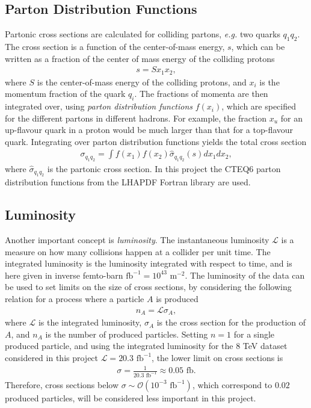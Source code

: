 \documentclass[twoside,english]{uiofysmaster}
\begin{document}
{\subsection{Parton Distribution Functions}

Partonic cross sections are calculated for colliding partons, \textit{e.g.} two quarks $q_1 q_2$. The cross section is a function of the center-of-mass energy, $s$, which can be written as a fraction of the center of mass energy of the colliding protons
\begin{align}
s = S x_1 x_2,
\end{align}
where $S$ is the center-of-mass energy of the colliding protons, and $x_i$ is the momentum fraction of the quark $q_i$. The fractions of momenta are then integrated over, using \textit{parton distribution functions} $f(x_i)$, which are specified for the different partons in different hadrons. For example, the fraction $x_u$ for an up-flavour quark in a proton would be much larger than that for a top-flavour quark. Integrating over parton distribution functions yields the total cross section
\begin{align}
\sigma_{q_1q_2} = \int f(x_1) f(x_2) \hat{\sigma}_{q_1q_2}(s) dx_1 dx_2,
\end{align}
where $\hat{\sigma}_{q_1q_2}$ is the partonic cross section. In this project the CTEQ6 parton distribution functions from the LHAPDF Fortran library \cite{PhysRevD.78.013004} are used.

\subsection{Luminosity}

Another important concept is \textit{luminosity}. The instantaneous luminosity $\mathcal{L}$ is a measure on how many collisions happen at a collider per unit time. The integrated luminosity is the luminosity integrated with respect to time, and is here given in inverse femto-barn $\text{fb}^{-1} = 10^{43} \text{ m}^{-2}$. The luminosity of the data can be used to set limits on the size of cross sections, by considering the following relation for a process where a particle $A$ is produced
\begin{align}
n_{A} = \mathcal{L} \sigma_{A} ,
\end{align}
where $\mathcal{L}$ is the integrated luminosity, $\sigma_{A}$ is the cross section for the production of $A$, and $n_A$ is the number of produced particles. Setting $n=1$ for a single produced particle, and using the integrated luminosity for the 8 TeV dataset considered in this project $\mathcal{L} = 20.3 \text{ fb}^{-1}$, the lower limit on cross sections is
\begin{align}
\sigma  = \frac{1}{20.3 \text{ fb}^{-1}} \approx 0.05 \text{ fb}.
\end{align}
Therefore, cross sections below $\sigma \sim \mathcal{O}(10^{-3} \text{ fb}^{-1})$, which correspond to $0.02$ produced particles, will be considered less important in this project.


}
\end{document}
